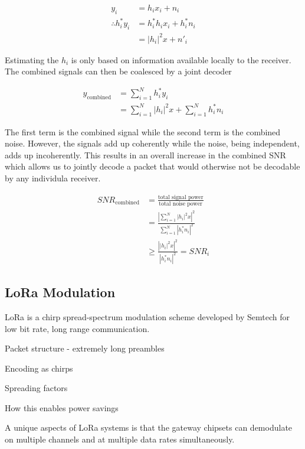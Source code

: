 \begin{align*}
y_i &= h_i x_i + n_i \\
\therefore h^*_i y_i &= h^*_i h_i x_i + h^*_i n_i \\
	&= \left| h_i \right|^2 x + n'_i
\end{align*}

Estimating the $h_i$ is only based on information available locally to the receiver.
The combined signals can then be coalesced by a joint decoder

\begin{align*}
y_{\text{combined}}
	&= \sum_{i=1}^N h^*_i y_i \\
	&= \sum_{i=1}^N \left| h_i \right|^2 x + \sum_{i=1}^N h^*_i n_i
\end{align*}

The first term is the combined signal while the second term is the combined
noise. However, the signals add up coherently while the noise, being
independent, adds up incoherently. This results in an overall increase in the
combined SNR which allows us to jointly decode a packet that would otherwise
not be decodable by any individula receiver.

\begin{align*}
SNR_{\text{combined}} &= \frac{\text{total signal power}}{\text{total noise power}} \\
	&= \frac{\left| \sum_{i=1}^N \left| h_i \right|^2 x \right|^2}{\sum_{i=1}^N \left| h^*_i n_i \right|^2} \\
	&\geq \frac{\left| \left| h_i \right|^2 x \right|^2}{\left| h^*_i n_i \right|^2} = SNR_i
\end{align*}

\subsection{LoRa Modulation}
\label{sec:lora}

LoRa is a chirp spread-spectrum modulation scheme developed by Semtech for low bit rate, long range communication.

{\color{blue}
Packet structure - extremely long preambles

Encoding as chirps

Spreading factors

How this enables power savings
}

A unique aspects of LoRa systems is that the gateway chipsets can demodulate on multiple channels and at multiple data rates simultaneously.

